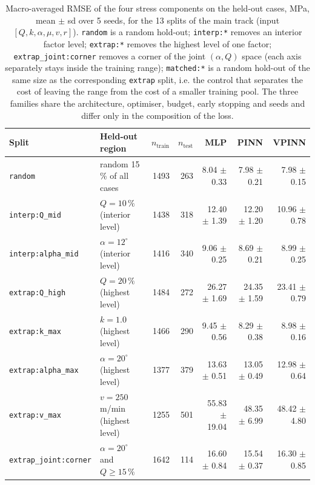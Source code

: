 \begin{table}[htbp]
\centering
\caption{Macro-averaged RMSE of the four stress components on the held-out cases, MPa, mean $\pm$ sd over 5 seeds, for the 13 splits of the main track (input $[Q,k,\alpha,\mu,v,r]$). \texttt{random} is a random hold-out; \texttt{interp:*} removes an interior factor level; \texttt{extrap:*} removes the highest level of one factor; \texttt{extrap\_joint:corner} removes a corner of the joint $(\alpha,Q)$ space (each axis separately stays inside the training range); \texttt{matched:*} is a random hold-out of the same size as the corresponding \texttt{extrap} split, i.e. the control that separates the cost of leaving the range from the cost of a smaller training pool. The three families share the architecture, optimiser, budget, early stopping and seeds and differ only in the composition of the loss.}
\label{tab:main}
\small
\begin{tabular}{@{}llrrrrr@{}}
\toprule
Split & Held-out region & $n_\mathrm{train}$ & $n_\mathrm{test}$ & MLP & PINN & VPINN \\
\midrule
\texttt{random} & random 15\,\% of all cases & 1493 & 263 & 8.04 $\pm$ 0.33 & 7.98 $\pm$ 0.21 & 7.98 $\pm$ 0.15 \\
\addlinespace
\texttt{interp:Q\_mid} & $Q = 10\,\%$ (interior level) & 1438 & 318 & 12.40 $\pm$ 1.39 & 12.20 $\pm$ 1.20 & 10.96 $\pm$ 0.78 \\
\texttt{interp:alpha\_mid} & $\alpha = 12^\circ$ (interior level) & 1416 & 340 & 9.06 $\pm$ 0.25 & 8.69 $\pm$ 0.21 & 8.99 $\pm$ 0.25 \\
\addlinespace
\texttt{extrap:Q\_high} & $Q = 20\,\%$ (highest level) & 1484 & 272 & 26.27 $\pm$ 1.69 & 24.35 $\pm$ 1.59 & 23.41 $\pm$ 0.79 \\
\texttt{extrap:k\_max} & $k = 1.0$ (highest level) & 1466 & 290 & 9.45 $\pm$ 0.56 & 8.29 $\pm$ 0.38 & 8.98 $\pm$ 0.16 \\
\texttt{extrap:alpha\_max} & $\alpha = 20^\circ$ (highest level) & 1377 & 379 & 13.63 $\pm$ 0.51 & 13.05 $\pm$ 0.49 & 12.98 $\pm$ 0.64 \\
\texttt{extrap:v\_max} & $v = 250$ m/min (highest level) & 1255 & 501 & 55.83 $\pm$ 19.04 & 48.35 $\pm$ 6.99 & 48.42 $\pm$ 4.80 \\
\addlinespace
\texttt{extrap\_joint:corner} & $\alpha = 20^\circ$ and $Q \ge 15\,\%$ & 1642 & 114 & 16.60 $\pm$ 0.84 & 15.54 $\pm$ 0.37 & 16.30 $\pm$ 0.85 \\

\end{tabular}
\end{table}
